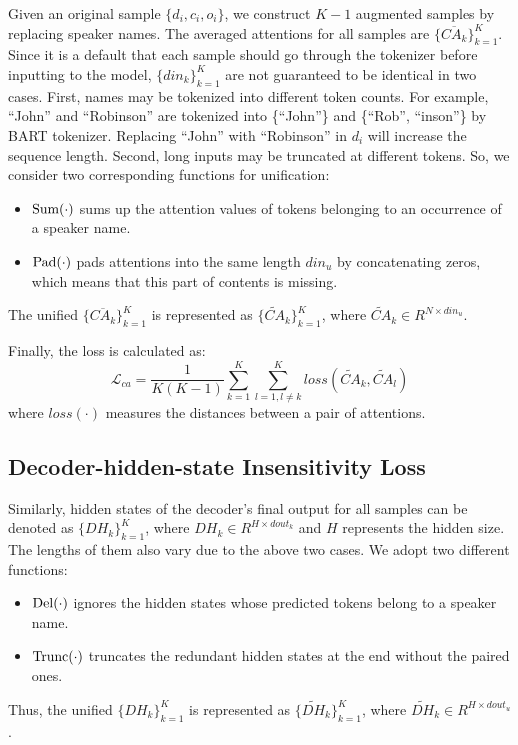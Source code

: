 Given an original sample $\{d_i, c_i, o_i\}$, we construct $K-1$ augmented samples by replacing speaker names. The averaged attentions for all samples are $\{\overline{CA_k}\}_{k=1}^K$. Since it is a default that each sample should go through the tokenizer before inputting to the model, $\{din_k\}_{k=1}^K$ are not guaranteed to be identical in two cases.
First, names may be tokenized into different token counts. For example, ``John'' and ``Robinson'' are tokenized into \{``John''\} and \{``Rob'', ``inson''\} by BART tokenizer. Replacing ``John'' with ``Robinson'' in $d_i$ will increase the sequence length. Second, long inputs may be truncated at different tokens. So, we consider two corresponding functions for unification: %
\begin{itemize}
\item $\rm{Sum(\cdot)}$ sums up the attention values of tokens belonging to an occurrence of a speaker name. 
\item $\rm{Pad(\cdot)}$ pads attentions into the same length $din_u$ by concatenating zeros, which means that this part of contents is missing.%
\end{itemize}
The unified $\{\overline{CA_k}\}_{k=1}^K$ is represented as $\{\widetilde{CA}_k\}_{k=1}^K$, where $\widetilde{CA}_k\in R^{N\times din_u}$.


Finally, the loss is calculated as:
\begin{equation}
	\mathcal{L}_{ca} = \frac{1}{K(K-1)} \sum_{k=1}^{K}\sum_{l=1, l\neq k}^{K} {loss}(\widetilde{CA}_k, \widetilde{CA}_l)
\end{equation}
where ${loss}(\cdot)$ measures the distances between a pair of attentions. 

\subsection{Decoder-hidden-state Insensitivity Loss}

Similarly, hidden states of the decoder's final output for all samples can be denoted as $\{DH_k\}_{k=1}^K$, where $DH_k\in R^{H\times dout_k}$ and $H$ represents the hidden size. The lengths of them also vary due to the above two cases. We adopt two different functions: %
\begin{itemize}
	\item $\rm{Del(\cdot)}$ ignores the hidden states whose predicted tokens belong to a speaker name.
	\item $\rm{Trunc(\cdot)}$ truncates the redundant hidden states at the end without the paired ones.
\end{itemize}
Thus, the unified $\{DH_k\}_{k=1}^K$ is represented as $\{\widetilde{DH}_k\}_{k=1}^K$, where $\widetilde{DH}_k\in R^{H\times dout_u}$.

